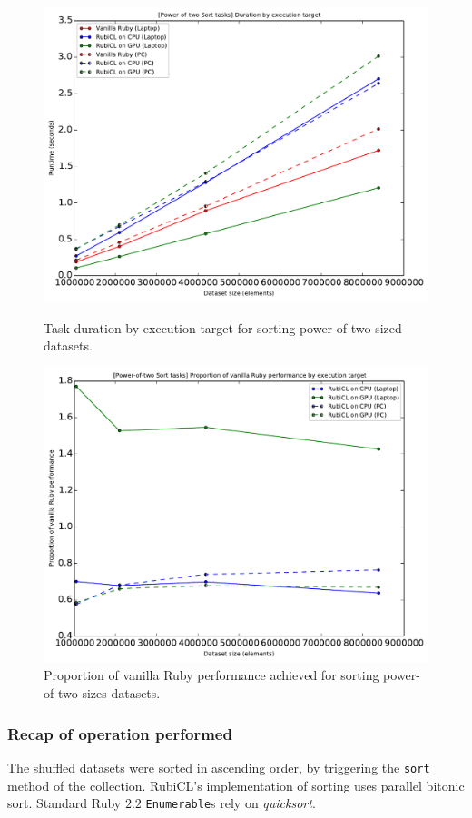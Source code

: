 \begin{figure}[H]
  \centering
  \includegraphics[width=\textwidth]{./graphing/sort_pow2/runtimes.pdf}
  \caption{Task duration by execution target for sorting power-of-two sized datasets.}
  \label{fig:sortpow_task_runtime_g}

  \includegraphics[width=\textwidth]{./graphing/sort_pow2/prop_van.pdf}
  \caption{Proportion of vanilla Ruby performance achieved for sorting power-of-two sizes datasets.}
  \label{fig:sortpow_van_perf_g}

\end{figure}

\subsubsection{Recap of operation performed}
The shuffled datasets were sorted in ascending order, by triggering the \verb|sort| method of the collection.
RubiCL's implementation of sorting uses parallel bitonic sort. Standard Ruby $2.2$ \verb|Enumerable|s rely on \emph{quicksort}.

